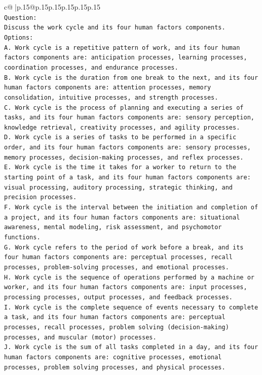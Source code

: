 \documentclass{article}
\begin{document}
{\begin{supertabular}{c@{$\;$}|p{.15\linewidth}@{}p{.15\linewidth}p{.15\linewidth}p{.15\linewidth}p{.15\linewidth}p{.15\linewidth}}
{{{\\ 
\texttt{Question:} \\
\texttt{Discuss the work cycle and its four human factors components.} \\
\texttt{Options:} \\
\texttt{A. Work cycle is a repetitive pattern of work, and its four human factors components are: anticipation processes, learning processes, coordination processes, and endurance processes.} \\
\texttt{B. Work cycle is the duration from one break to the next, and its four human factors components are: attention processes, memory consolidation, intuitive processes, and strength processes.} \\
\texttt{C. Work cycle is the process of planning and executing a series of tasks, and its four human factors components are: sensory perception, knowledge retrieval, creativity processes, and agility processes.} \\
\texttt{D. Work cycle is a series of tasks to be performed in a specific order, and its four human factors components are: sensory processes, memory processes, decision{-}making processes, and reflex processes.} \\
\texttt{E. Work cycle is the time it takes for a worker to return to the starting point of a task, and its four human factors components are: visual processing, auditory processing, strategic thinking, and precision processes.} \\
\texttt{F. Work cycle is the interval between the initiation and completion of a project, and its four human factors components are: situational awareness, mental modeling, risk assessment, and psychomotor functions.} \\
\texttt{G. Work cycle refers to the period of work before a break, and its four human factors components are: perceptual processes, recall processes, problem{-}solving processes, and emotional processes.} \\
\texttt{H. Work cycle is the sequence of operations performed by a machine or worker, and its four human factors components are: input processes, processing processes, output processes, and feedback processes.} \\
\texttt{I. Work cycle is the complete sequence of events necessary to complete a task, and its four human factors components are: perceptual processes, recall processes, problem solving (decision{-}making) processes, and muscular (motor) processes.} \\
\texttt{J. Work cycle is the sum of all tasks completed in a day, and its four human factors components are: cognitive processes, emotional processes, problem solving processes, and physical processes.} \\
            }
        }
    }
     \\ \\


\end{supertabular}}
\end{document}
